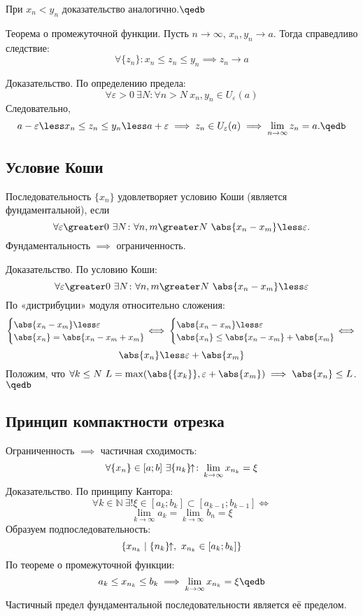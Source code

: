 При $x_n\less y_n$ доказательство аналогично.$\qedb$

\begin{theorem}
{\bold Теорема о промежуточной функции.} Пусть $n\to\infty$, $x_n,y_n\to a$. Тогда справедливо следствие:
$$\forall\{z_n\}\colon x_n\leq z_n\leq y_n\implies z_n\to a$$
\end{theorem}

{\bold Доказательство.} По определению предела:
$$\forall\varepsilon\greater 0\ \exists N\colon\forall n\greater N\ x_n,y_n\in U_
\varepsilon(a)$$
Следовательно,
$$a-\varepsilon\less x_n\leq z_n\leq y_n\less a+\varepsilon\implies z_n\in U_
\varepsilon(a)\implies\lim_{n\to\infty}z_n=a.\qedb$$

\subsection{Условие Коши}

Последовательность $\{x_n\}$ удовлетворяет {\ital условию Коши} {\ital\color{desc} 
(является фундаментальной)}, если
$$\forall\varepsilon\greater 0\ \exists N\colon\forall n,m\greater N\ \abs{x_n-x_m}\less
\varepsilon.$$
Фундаментальность $\implies$ ограниченность.

{\bold Доказательство.} По условию Коши:
$$\forall\varepsilon\greater 0\ \exists N\colon\forall n,m\greater N\ \abs{x_n-x_m}\less
\varepsilon$$
По «дистрибуции» модуля относительно сложения:
$$\begin{cases}
\abs{x_n-x_m}\less\varepsilon\\
\abs{x_n}=\abs{x_n-x_m+x_m}
\end{cases}\hspace*{-12pt}\iff
\begin{cases}
\abs{x_n-x_m}\less\varepsilon\\
\abs{x_n}\leq\abs{x_n-x_m}+\abs{x_m}
\end{cases}\hspace*{-12pt}\iff$$
$$\abs{x_n}\less\varepsilon+\abs{x_m}$$
Положим, что $\forall k\leq N\ L=\max(\abs{\{x_k\}},\varepsilon+\abs{x_m})\implies
\abs{x_n}\leq L$.$\qedb$

\subsection{Принцип компактности отрезка}

Ограниченность $\implies$ частичная сходимость:
$$\forall\{x_n\}\in[a;b]\ \exists\{n_k\}\kern-4pt\uparrow\colon\lim_{k\to\infty}x_{n_k}=
\xi$$
{\bold Доказательство.} По принципу Кантора:
$$\forall k\in\mathbb{N}\ \exists!\xi\in[a_k;b_k]\subset[a_{k-1};b_{k-1}]\iff$$
$$\lim_{k\to\infty}a_k=\lim_{k\to\infty}b_n=\xi$$
Образуем подпоследовательность:
$$\{x_{n_k}\mid \{n_k\}\kern-4pt\uparrow,\ x_{n_k}\in[a_k;b_k]\}$$
По теореме о промежуточной функции:
$$a_k\leq x_{n_k}\leq b_k\implies \lim_{k\to\infty}x_{n_k}=\xi\qedb$$
Частичный предел фундаментальной последовательности является её пределом.

